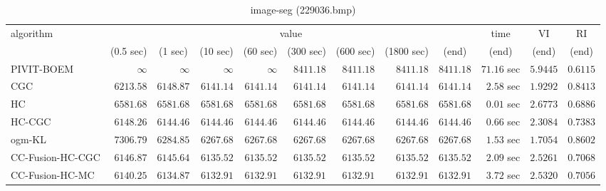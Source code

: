 \begin{table}[H]
\scriptsize
\centering
\caption{image-seg (229036.bmp)}
\label{tab:anytimetable-image-seg-229036.bmp}
\begin{tabular}{lrrrrrrrrrrr}
\toprule
           algorithm &                                   \multicolumn{8}{c}{value} & \multicolumn{1}{c}{time}    & \multicolumn{1}{c}{VI}  & \multicolumn{1}{c}{RI} \\  
\cmidrule(lr){2-9}\cmidrule(lr){10-10} \cmidrule(lr){11-11} \cmidrule(lr){12-12}   
                     & \multicolumn{1}{c}{(0.5 sec)} & \multicolumn{1}{c}{(1 sec)} & \multicolumn{1}{c}{(10 sec)} & \multicolumn{1}{c}{(60 sec)} & \multicolumn{1}{c}{(300 sec)} & \multicolumn{1}{c}{(600 sec)} & \multicolumn{1}{c}{(1800 sec)} & \multicolumn{1}{c}{(end)} & \multicolumn{1}{c}{(end)}    & \multicolumn{1}{c}{(end)}   & \multicolumn{1}{c}{(end)}  \\ \midrule 
          PIVIT-BOEM & $\infty$ & $\infty$ & $\infty$ & $\infty$ & $      8411.18$ & $      8411.18$ & $      8411.18$ & $      8411.18$ & $        71.16$ sec    & $       5.9445$  & $       0.6115$ \\ 
                 CGC & $      6213.58$ & $      6148.87$ & $      6141.14$ & $      6141.14$ & $      6141.14$ & $      6141.14$ & $      6141.14$ & $      6141.14$ & $         2.58$ sec    & $       1.9292$  & $       0.8413$ \\ 
                  HC & $      6581.68$ & $      6581.68$ & $      6581.68$ & $      6581.68$ & $      6581.68$ & $      6581.68$ & $      6581.68$ & $      6581.68$ & $         0.01$ sec    & $       2.6773$  & $       0.6886$ \\ 
              HC-CGC & $      6148.26$ & $      6144.46$ & $      6144.46$ & $      6144.46$ & $      6144.46$ & $      6144.46$ & $      6144.46$ & $      6144.46$ & $         0.66$ sec    & $       2.3084$  & $       0.7383$ \\ 
              ogm-KL & $      7306.79$ & $      6284.85$ & $      6267.68$ & $      6267.68$ & $      6267.68$ & $      6267.68$ & $      6267.68$ & $      6267.68$ & $         1.53$ sec    & $       1.7054$  & $       0.8602$ \\ 
    CC-Fusion-HC-CGC & $      6146.87$ & $      6145.64$ & $      6135.52$ & $      6135.52$ & $      6135.52$ & $      6135.52$ & $      6135.52$ & $      6135.52$ & $         2.09$ sec    & $       2.5261$  & $       0.7068$ \\ 
     CC-Fusion-HC-MC & $      6140.25$ & $      6134.87$ & $      6132.91$ & $      6132.91$ & $      6132.91$ & $      6132.91$ & $      6132.91$ & $      6132.91$ & $         3.72$ sec    & $       2.5320$  & $       0.7056$ \\ 

\end{tabular}
\end{table}
